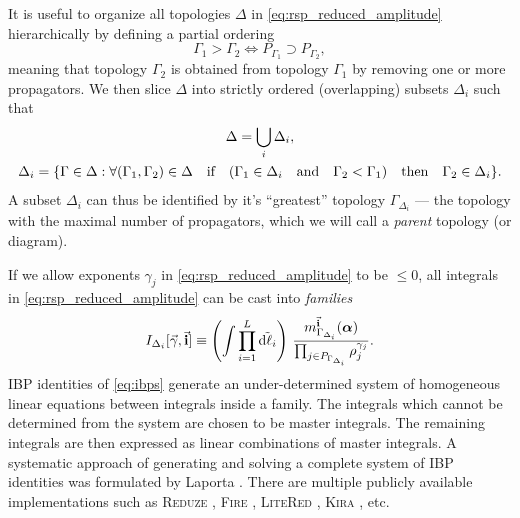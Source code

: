 It is useful to organize all topologies $\Delta$ in \cref{eq:rsp_reduced_amplitude}
hierarchically by defining a partial ordering
\begin{equation} \label{eq:topology_order}
    \Gamma_1 > \Gamma_2 \iff P_{\Gamma_1} \supset P_{\Gamma_2},
\end{equation}
meaning that topology $\Gamma_2$ is obtained from topology $\Gamma_1$ by removing one or more propagators.
We then slice $\Delta$ into strictly ordered (overlapping) subsets $\Delta_i$ such that
\begin{subequations} \label{eq:topology_sequence}
    \begin{gather}
         \Delta = \bigcup_i \Delta_i,  \\
         \Delta_i  = \{\Gamma \in \Delta : \forall (\Gamma_1, \Gamma_2) \in\Delta \qif\qty( \Gamma_1 \in \Delta_i \qand \Gamma_2 < \Gamma_1) \qthen \Gamma_2 \in \Delta_i \}.
    \end{gather}
\end{subequations}
A subset $\Delta_i$ can thus be identified by it's ``greatest'' topology $\Gamma_{\Delta_i}$ ---
the topology with the maximal number of propagators, which we will call a \emph{parent} topology (or diagram).

If we allow exponents $\gamma_j$ in \cref{eq:rsp_reduced_amplitude} to be $\leq0$,
all integrals in \cref{eq:rsp_reduced_amplitude} can be cast into \emph{families}
\begin{equation} \label{eq:integral_families}
    I_{\Delta_i}[\va{\gamma},\va{i}] \equiv 
  \qty(\int \prod_{i=1}^{L} \tilde{\dd{\ell_i}}) ~  
  \frac{m^{\va{i}}_{\Gamma_{\Delta_i}}(\vb*{\alpha})%
    }{\prod_{j\in P_{\Gamma_{\Delta_i}}} \rho_j^{\gamma_{j}}}.
\end{equation}
IBP identities of \cref{eq:ibps} generate an under-determined system of homogeneous linear equations between integrals inside a family.
The integrals which cannot be determined from the system are chosen to be master integrals.
The remaining integrals are then expressed as linear combinations of master integrals.
A systematic approach of generating and solving a complete system of IBP identities was formulated by Laporta \cite{Laporta:2001dd}.
There are multiple publicly available implementations such as
\textsc{Reduze} \cite{Studerus:2009ye,vonManteuffel:2012np},
\textsc{Fire} \cite{Smirnov:2008iw,Smirnov:2014hma},
\textsc{LiteRed} \cite{Lee:2012cn,Lee:2013mka},
\textsc{Kira} \cite{Maierhoefer:2017hyi,Maierhofer:2018gpa}, etc.

